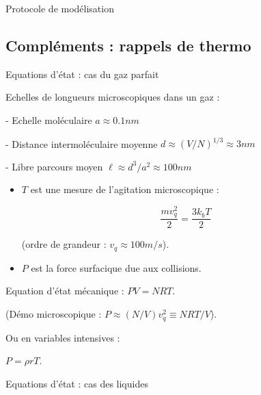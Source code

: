 {\begin{frame}{Protocole de modélisation}
\vspace{20mm}

\end{frame}






\subsection{Compléments : rappels de thermo}


\begin{frame}{Equations d'état : cas du gaz parfait}


Echelles de longueurs microscopiques dans un gaz :

- Echelle moléculaire $a \approx 0.1 nm$

- Distance intermoléculaire moyenne $d \approx (V/N)^{1/3} \approx 3 nm$

- Libre parcours moyen $\ell \approx d^3 / a^2  \approx 100 nm$ 


\begin{itemize}
\item 
$T$ est une mesure de l'agitation microscopique :

$$
 \frac{m v_q^2}{2} = \frac{3 k_b T}{2}
$$

(ordre de grandeur : $v_q \approx 100 m/s$). 

\item 
$P$ est la force surfacique due aux collisions.

\end{itemize}


Equation d'état mécanique : $PV =  NRT$.
 
 (Démo microscopique :  $P \approx (N/V) v_q^2 \equiv NRT/V$).
 
 \medskip

Ou en variables intensives :

$P = \rho r T$.

 
 
  
 
\end{frame}

\begin{frame}{Equations d'état : cas des liquides}


\end{frame}}
